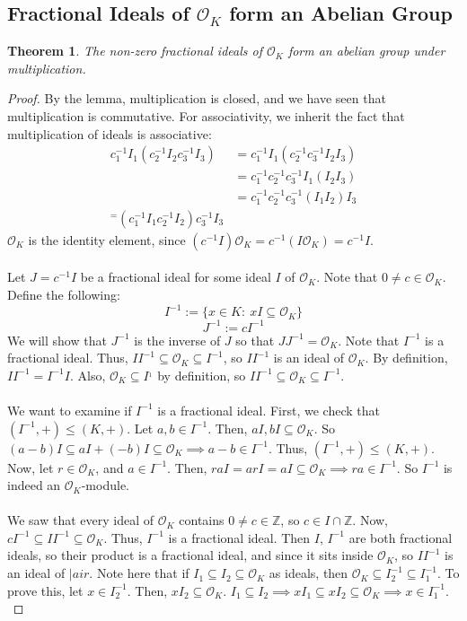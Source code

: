\documentclass{article}
\newcommand{\air}{\mathcal{O}_K}
\newcommand{\Z}{\mathbb{Z}}
\newtheorem{theorem}{Theorem}[subsection]
\begin{document}
\subsection{Fractional Ideals of $\air$ form an Abelian Group}
\begin{theorem}
The non-zero fractional ideals of $\air$ form an abelian group under multiplication.
\end{theorem}
\begin{proof}
By the lemma, multiplication is closed, and we have seen that multiplication is commutative. For associativity, we inherit the fact that multiplication of ideals is associative:
\begin{align*}
    c_1^{-1}I_1(c_2^{-1}I_2c_3^{-1}I_3)&=c_1^{-1}I_1(c_2^{-1}c_3^{-1}I_2I_3)\\
    &=c_1^{-1}c_2^{-1}c_3^{-1}I_1(I_2I_3)\\
    &=c_1^{-1}c_2^{-1}c_3^{-1}(I_1I_2)I_3\\
    ^=(c_1^{-1}I_1c_2^{-1}I_2)c_3^{-1}I_3
\end{align*}
$\air$ is the identity element, since $(c^{-1}I)\air = c^{-1}(I\air)=c^{-1}I$.\\
\\
Let $J=c^{-1}I$ be a fractional ideal for some ideal $I$ of $\air$. Note that $0\neq c\in\air$. Define the following:
$$I^{-1}:=\{x\in K:\ xI\subseteq \air\}$$
$$J^{-1}:=cI^{-1}$$
We will show that $J^{-1}$ is the inverse of $J$ so that $JJ^{-1}=\air$. Note that  $I^{-1}$ is a fractional ideal. Thus, $II^{-1}\subseteq \air \subseteq I^{-1}$, so $II^{-1}$ is an ideal of $\air$. By definition, $II^{-1}=I^{-1}I$. Also, $\air\subseteq I^{_1}$ by definition, so $II^{-1}\subseteq\air\subseteq I^{-1}$.\\
\\
We want to examine if $I^{-1}$ is a fractional ideal. First, we check that $(I^{-1},+)\leq (K,+)$. Let $a,b\in I^{-1}$. Then, $aI,bI\subseteq \air$. So $(a-b)I\subseteq aI + (-b)I\subseteq \air\implies a-b\in I^{-1}$. Thus, $(I^{-1},+)\leq (K,+)$. Now, let $r\in\air$, and $a\in I^{-1}$. Then, $raI = arI = aI\subseteq \air\implies ra\in I^{-1}$. So $I^{-1}$ is indeed an $\air$-module.\\
\\
We saw that every ideal of $\air$ contains $0\neq c\in\Z$, so $c\in I\cap \Z$. Now, $cI^{-1}\subseteq II^{-1}\subseteq\air$. Thus, $I^{-1}$ is a fractional ideal. Then $I$, $I^{-1}$ are both fractional ideals, so their product is a fractional ideal, and since it sits inside $\air$, so $II^{-1}$ is an ideal of $|air$. Note here that if $I_1\subseteq I_2\subseteq \air$ as ideals, then $\air \subseteq I_2^{-1}\subseteq I_1^{-1}$. To prove this, let $x\in I_2^{-1}$.  Then, $xI_2\subseteq \air$. $I_1\subseteq I_2\implies xI_1\subseteq xI_2\subseteq\air\implies x\in I_1^{-1}$.\\

\end{proof}
\end{document}
